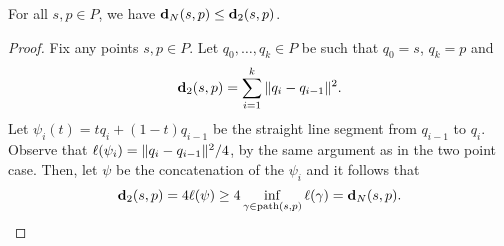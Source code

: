   \begin{lemma}\label{lem:dist_N_le_dist}
    For all $s,p\in P$, we have $\mathbf{d}_N(s,p)\le \mathbf{d}_2(s,p)$.
  \end{lemma}
  \begin{proof}
    Fix any points $s,p\in P$.
    Let $q_0,\ldots, q_k \in P$ be such that $q_0 = s$, $q_k = p$ and
    \[
      \mathbf{d}_2(s,p) = \sum_{i=1}^k \|q_i - q_{i-1}\|^2.
    \]
    Let $\psi_i(t) = tq_i + (1-t)q_{i-1}$ be the straight line segment from $q_{i-1}$ to $q_i$.
    Observe that $\ell(\psi_i) = \|q_i - q_{i-1}\|^2 / 4$, by the same argument as in the two point case.
    Then, let $\psi$ be the concatenation of the $\psi_i$ and it follows that
    \[
      \mathbf{d}_2(s,p) = 4 \ell(\psi) \ge 4 \inf_{\gamma\in \mathrm{path}(s,p)} \ell(\gamma) = \mathbf{d}_N(s,p).\qedhere
    \]
  \end{proof}

\vspace{3 mm}
  

